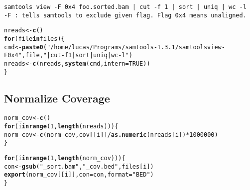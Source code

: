 \documentclass{article}\usepackage[]{graphicx}\usepackage[]{color}
\makeatletter
\newcommand{\hlnum}[1]{\textcolor[rgb]{0.686,0.059,0.569}{#1}}%
\newcommand{\hlstr}[1]{\textcolor[rgb]{0.192,0.494,0.8}{#1}}%
\newcommand{\hlopt}[1]{\textcolor[rgb]{0,0,0}{#1}}%
\newcommand{\hlstd}[1]{\textcolor[rgb]{0.345,0.345,0.345}{#1}}%
\newcommand{\hlkwa}[1]{\textcolor[rgb]{0.161,0.373,0.58}{\textbf{#1}}}%
\newcommand{\hlkwb}[1]{\textcolor[rgb]{0.69,0.353,0.396}{#1}}%
\newcommand{\hlkwc}[1]{\textcolor[rgb]{0.333,0.667,0.333}{#1}}%
\newcommand{\hlkwd}[1]{\textcolor[rgb]{0.737,0.353,0.396}{\textbf{#1}}}%
\newenvironment{kframe}{%
 \def\at@end@of@kframe{}%
 \ifinner\ifhmode%
  \def\at@end@of@kframe{\end{minipage}}%
  \begin{minipage}{\columnwidth}%
 \fi\fi%
 \def\FrameCommand##1{\hskip\@totalleftmargin \hskip-\fboxsep
 \colorbox{shadecolor}{##1}\hskip-\fboxsep
     \hskip-\linewidth \hskip-\@totalleftmargin \hskip\columnwidth}%
 \MakeFramed {\advance\hsize-\width
   \@totalleftmargin\z@ \linewidth\hsize
   \@setminipage}}%
 {\par\unskip\endMakeFramed%
 \at@end@of@kframe}
\newenvironment{knitrout}{}{} %
\makeatother
\begin{document}
\begin{verbatim}
samtools view -F 0x4 foo.sorted.bam | cut -f 1 | sort | uniq | wc -l
-F : tells samtools to exclude given flag. Flag 0x4 means unaligned.
\end{verbatim}

\begin{knitrout}
\color{fgcolor}\begin{kframe}
\begin{alltt}
\hlstd{nreads} \hlkwb{<-} \hlkwd{c}\hlstd{()}
\hlkwa{for} \hlstd{(file} \hlkwa{in} \hlstd{files) \{}
  \hlstd{cmd} \hlkwb{<-} \hlkwd{paste0}\hlstd{(}\hlstr{"/home/lucas/Programs/samtools-1.3.1/samtools view -F 0x4 "}\hlstd{, file,} \hlstr{" | cut -f 1 | sort | uniq | wc -l"}\hlstd{)}
  \hlstd{nreads} \hlkwb{<-} \hlkwd{c}\hlstd{(nreads,}\hlkwd{system}\hlstd{(cmd,} \hlkwc{intern} \hlstd{=} \hlnum{TRUE}\hlstd{))}
\hlstd{\}}
\end{alltt}
\end{kframe}
\end{knitrout}

\subsection{Normalize Coverage}
\begin{knitrout}
\color{fgcolor}\begin{kframe}
\begin{alltt}
\hlstd{norm_cov} \hlkwb{<-} \hlkwd{c}\hlstd{()}
\hlkwa{for} \hlstd{(i} \hlkwa{in} \hlkwd{range}\hlstd{(}\hlnum{1}\hlstd{,}\hlkwd{length}\hlstd{(nreads)))\{}
  \hlstd{norm_cov} \hlkwb{<-} \hlkwd{c}\hlstd{(norm_cov, cov[[i]]}\hlopt{/}\hlkwd{as.numeric}\hlstd{(nreads[i])}\hlopt{*}\hlnum{1000000}\hlstd{)}
\hlstd{\}}
\end{alltt}
\end{kframe}
\end{knitrout}


\begin{knitrout}
\color{fgcolor}\begin{kframe}
\begin{alltt}
\hlkwa{for} \hlstd{(i} \hlkwa{in} \hlkwd{range}\hlstd{(}\hlnum{1}\hlstd{,} \hlkwd{length}\hlstd{(norm_cov)))\{}
  \hlstd{con} \hlkwb{<-} \hlkwd{gsub}\hlstd{(}\hlstr{"_sort.bam"}\hlstd{,} \hlstr{"_cov.bed"}\hlstd{, files[i])}
  \hlkwd{export}\hlstd{(norm_cov[[i]],} \hlkwc{con} \hlstd{= con,} \hlkwc{format} \hlstd{=} \hlstr{"BED"}\hlstd{)}
\hlstd{\}}
\end{alltt}
\end{kframe}
\end{knitrout}
\end{document}
